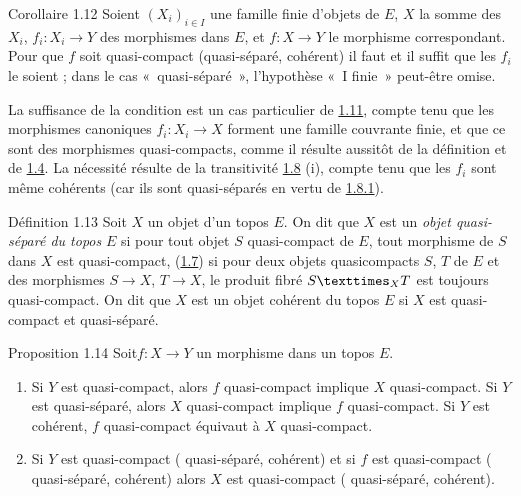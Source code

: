\documentclass[10pt]{../fichiers-configuration-latex/smfart}
\begin{document}
\begin{enonce*}{Corollaire 1.12}
Soient $(X_i)_{i \in I}$ une famille finie d'objets de $E$, $X$ la
somme des $X_i$, $f_i : X_i \to Y$ des morphismes dans $E$, et $f : X
\to Y$ le morphisme correspondant. Pour que $f$ soit quasi-compact
(\resp quasi-séparé, \resp cohérent) il faut et il suffit que les
$f_i$ le soient ; dans le cas « quasi-séparé », l'hypothèse « I
finie » peut-être omise.
\end{enonce*}

La suffisance de la condition est un cas particulier de \hyperref[VI.cor1.11]{1.11}, compte
tenu que les morphismes canoniques $f_i : X_i \to X$ forment une
famille couvrante finie, et que ce sont des morphismes quasi-compacts,
comme il résulte aussitôt de la définition et de \hyperref[VI.cor1.4]{1.4}. La nécessité
résulte de la transitivité \hyperref[VI.prop1.8]{1.8} (i), compte tenu que les $f_i$ sont
même cohérents (car ils sont quasi-séparés en vertu de \hyperref[VI.cor1.8.1]{1.8.1}).

\begin{enonce*}{Définition 1.13}
Soit $X$ un objet d'un topos $E$. On dit que $X$ est un \emph{objet
quasi-séparé du topos} $E$ si pour tout objet $S$ quasi-compact
de $E$, tout morphisme de $S$ dans $X$ est quasi-compact, \ie (\hyperref[VI.def1.7]{1.7}) si
pour deux objets quasicompacts $S$, $T$ de $E$ et des morphismes $S
\to X$, $T \to X$, le produit fibré $\fprod{S}{T}{X}$ est toujours
quasi-compact. On dit que $X$ est un objet cohérent du topos $E$ si
$X$ est quasi-compact et quasi-séparé.
\end{enonce*}

\begin{enonce*}{Proposition 1.14}
Soit\pageoriginale $f : X \to Y$ un morphisme dans un topos $E$.
\begin{enumerate}
\renewcommand{\theenumi}{\roman{enumi}}
\renewcommand{\labelenumi}{(\theenumi)}
\item Si $Y$ est quasi-compact, alors $f$ quasi-compact implique $X$
  quasi-compact. Si $Y$ est quasi-séparé, alors $X$ quasi-compact
  implique $f$ quasi-compact. Si $Y$ est cohérent, $f$ quasi-compact
  équivaut à $X$ quasi-compact.

\item Si $Y$ est quasi-compact (\emph{\resp} quasi-séparé,
  \emph{\resp} cohérent) et
  si $f$ est quasi-compact (\emph{\resp} quasi-séparé,
\emph{\resp} cohérent) alors
  $X$ est quasi-compact (\emph{\resp} quasi-séparé, \emph{\resp} cohérent).
\end{enumerate}
\end{enonce*}
\end{document}
